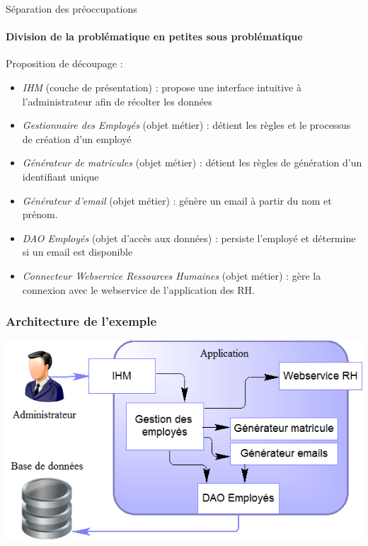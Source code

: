 \documentclass[compress]{beamer}%
\begin{document}
\begin{frame}{Séparation des préoccupations}
	\framesubtitle{Division de la problématique en petites sous problématique}
	
	Proposition de découpage :
	\pause
	\begin{itemize}[<+->]
	\item \emph{IHM} (couche de présentation) : propose une interface intuitive à l'administrateur afin de récolter les données
	\item \emph{Gestionnaire des Employés} (objet métier) : détient les règles et le processus de création d'un employé
	\item \emph{Générateur de matricules} (objet métier) : détient les règles de génération d'un identifiant unique
	\item \emph{Générateur d'email} (objet métier) : génère un email à partir du nom et prénom.
	\item \emph{DAO Employés} (objet d'accès aux données) : persiste l'employé et détermine si un email est disponible
	\item \emph{Connecteur Webservice Ressources Humaines} (objet métier) : gère la connexion avec le webservice de l'application des RH.
	\end{itemize}
	
\end{frame}

\begin{frame}
	\frametitle{Architecture de l'exemple}

	\begin{center}	
	\includegraphics[width=\textwidth]{images/spring_usecase.png}
	\end{center}
\end{frame}
\end{document}
